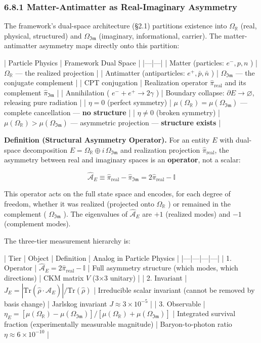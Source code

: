 \documentclass[11pt,a4paper]{article}
\theoremstyle{definition}
\theoremstyle{remark}
\begin{document}
\subsubsection{6.8.1 Matter-Antimatter as Real-Imaginary Asymmetry}

The framework's dual-space architecture (\S 2.1) partitions existence into $\Omega_{\mathbb{R}}$ (real, physical, structured) and $\Omega_{\mathfrak{Im}}$ (imaginary, informational, carrier). The matter-antimatter asymmetry maps directly onto this partition:

| Particle Physics | Framework Dual Space |
|---|---|
| Matter (particles: $e^-, p, n$ ) | $\Omega_{\mathbb{R}}$ — the realized projection |
| Antimatter (antiparticles: $e^+, \bar{p}, \bar{n}$ ) | $\Omega_{\mathfrak{Im}}$ — the conjugate complement |
| CPT conjugation | Realization operator $\hat{\pi}_{\text{real}}$ and its complement $\hat{\pi}_{\mathfrak{Im}}$ |
| Annihilation ( $e^- + e^+ \to 2\gamma$ ) | Boundary collapse: $\partial E \to \varnothing$, releasing pure radiation |
| $\eta = 0$ (perfect symmetry) | $\mu(\Omega_{\mathbb{R}}) = \mu(\Omega_{\mathfrak{Im}})$ — complete cancellation — \textbf{no structure} |
| $\eta \neq 0$ (broken symmetry) | $\mu(\Omega_{\mathbb{R}}) > \mu(\Omega_{\mathfrak{Im}})$ — asymmetric projection — \textbf{structure exists} |

\textbf{Definition (Structural Asymmetry Operator).} For an entity $E$ with dual-space decomposition $E = \Omega_{\mathbb{R}} \oplus i\,\Omega_{\mathfrak{Im}}$ and realization projection $\hat{\pi}_{\text{real}}$, the asymmetry between real and imaginary spaces is an \textbf{operator}, not a scalar:


\begin{equation}
\hat{\mathcal{A}}_E \equiv \hat{\pi}_{\text{real}} - \hat{\pi}_{\mathfrak{Im}} = 2\hat{\pi}_{\text{real}} - \mathbb{I}
\end{equation}


This operator acts on the full state space and encodes, for each degree of freedom, whether it was realized (projected onto $\Omega_{\mathbb{R}}$ ) or remained in the complement ( $\Omega_{\mathfrak{Im}}$ ). The eigenvalues of $\hat{\mathcal{A}}_E$ are $+1$ (realized modes) and $-1$ (complement modes).

The three-tier measurement hierarchy is:

| Tier | Object | Definition | Analog in Particle Physics |
|---|---|---|---|
| 1. Operator | $\hat{\mathcal{A}}_E = 2\hat{\pi}_{\text{real}} - \mathbb{I}$ | Full asymmetry structure (which modes, which directions) | CKM matrix $V$ (3×3 unitary) |
| 2. Invariant | $J_E = |\text{Tr}(\hat{\rho} \cdot \hat{\mathcal{A}}_E)| / \text{Tr}(\hat{\rho})$ | Irreducible scalar invariant (cannot be removed by basis change) | Jarlskog invariant $J \approx 3 \times 10^{-5}$ |
| 3. Observable | $\eta_E = [\mu(\Omega_{\mathbb{R}}) - \mu(\Omega_{\mathfrak{Im}})] / [\mu(\Omega_{\mathbb{R}}) + \mu(\Omega_{\mathfrak{Im}})]$ | Integrated survival fraction (experimentally measurable magnitude) | Baryon-to-photon ratio $\eta \approx 6 \times 10^{-10}$ |
\end{document}
